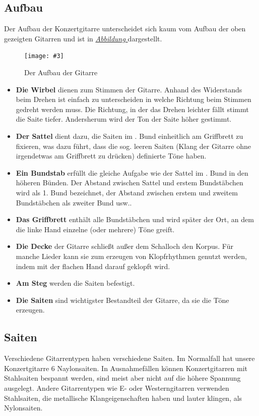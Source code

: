 \documentclass[a4paper, 12pt]{article}
\newcounter{figurecounter}
\newcommand{\addImage}[5]{%
    \begin{figure} [#1]
        \centering
        {\color{white}\tiny \hypertarget{#5}{}}
        \texttt{[image: \#3]}
        \caption{#4} \label{#5lbl}
    \end{figure}}
\newcommand{\figref}[1]{\setcounterref{figurecounter}{#1lbl}\hyperlink{#1}{\color{col_ref}\textsl{Abbildung \thefigurecounter}}}
\newcommand{\quotes}[1]{\glqq #1\grqq\xspace}
\begin{document}
    \subsection{Aufbau}
    Der Aufbau der Konzertgitarre unterscheidet sich kaum vom Aufbau der oben gezeigten Gitarren und ist in \figref{fig:aufbau} dargestellt.
    \addImage{h}{width=0.8\textwidth}{pictures/guitar_labeled}{Der Aufbau der Gitarre}{fig:aufbau}
    \begin{itemize}
        \item \textbf{Die Wirbel} dienen zum Stimmen der Gitarre. Anhand des Widerstands beim Drehen ist einfach zu unterscheiden
        in welche Richtung beim Stimmen gedreht werden muss. Die Richtung, in der das Drehen leichter fällt stimmt die Saite tiefer.
        Andersherum wird der Ton der Saite höher gestimmt.
        \item \textbf{Der Sattel} dient dazu, die Saiten im \quotes{0. Bund} einheitlich am Griffbrett zu fixieren, was dazu führt, dass die sog. 
        leeren Saiten (Klang der Gitarre ohne irgendetwas am Griffbrett zu drücken) definierte Töne haben.
        \item \textbf{Ein Bundstab} erfüllt die gleiche Aufgabe wie der Sattel im \quotes{0. Bund} in den höheren Bünden. Der Abstand zwischen Sattel 
        und erstem Bundstäbchen wird als 1. Bund bezeichnet, der Abstand zwischen erstem und zweitem Bundstäbchen als zweiter Bund usw..
        \item \textbf{Das Griffbrett} enthält alle Bundstäbchen und wird später der Ort, an dem die linke Hand einzelne (oder mehrere) Töne greift.
        \item \textbf{Die Decke} der Gitarre schließt außer dem Schalloch den Korpus. Für manche Lieder kann sie zum erzeugen von Klopfrhythmen
        genutzt werden, indem mit der flachen Hand darauf geklopft wird.
        \item \textbf{Am Steg} werden die Saiten befestigt.
        \item \textbf{Die Saiten} sind wichtigster Bestandteil der Gitarre, da sie die Töne erzeugen.
    \end{itemize}

    \subsection{Saiten}
    Verschiedene Gitarrentypen haben verschiedene Saiten. Im Normalfall hat unsere Konzertgitarre 6 Naylonsaiten.
    In Ausnahmefällen können Konzertgitarren mit Stahlsaiten bespannt werden, sind meist aber nicht auf die höhere Spannung ausgelegt.
    Andere Gitarrentypen wie E- oder Westerngitarren verwenden Stahlsaiten, die metallische Klangeigenschaften haben und lauter klingen, als Nylonsaiten.
\end{document}
